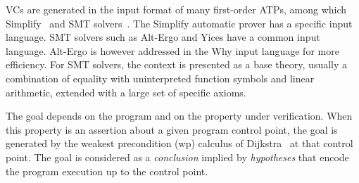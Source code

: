 \documentclass{acm_proc_article-sp}
\theoremstyle{nonumberplain}
\begin{document}
VCs are generated in the input format of many first-order ATPs, among
which Simplify~\cite{simplify05} and SMT solvers~\cite{dMDS07}. The
Simplify automatic prover has a specific input language. SMT solvers
such as Alt-Ergo and Yices have a common input language. Alt-Ergo is
however addressed in the Why input language for more efficiency. For
SMT solvers, the context is presented as a base theory, usually a
combination of equality with uninterpreted function symbols and linear
arithmetic, extended with a large set of specific axioms.



The goal depends on the program and on the property under verification.
When this property is an assertion about a given program control point,
the goal is generated by the weakest precondition (wp) calculus of
Dijkstra~\cite{Dijkstra76} at that control point. The goal is
considered as a \emph{conclusion} implied by \emph{hypotheses} that
encode the program execution up to the control point.
\end{document}
